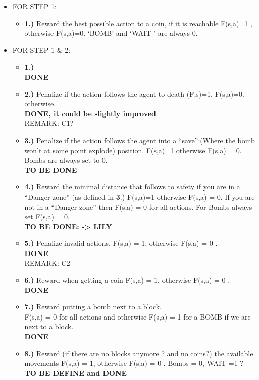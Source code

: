 \documentclass[a4paper]{article}
\begin{document}
\begin{itemize}

\item FOR STEP 1:
\begin{itemize} 
\item \textbf{1.)} Reward the best possible action to a coin, if it is reachable F(s,a)=1 ,  otherwise F(s,a)=0.    `BOMB' and `WAIT ' are always 0.
\end{itemize}

\item FOR STEP 1 \& 2:
\begin {itemize}
\item \textbf{1.)} \\  \textbf{DONE}  
\item  \textbf{2.)} Penalize if the action follows the agent to death (F,s)=1, F(s,a)=0. otherwise.  \\ \textbf{DONE, it could be slightly improved} \\
REMARK: C1?
\item \textbf{3.)} Penalize if the action follows the agent into a ``save'':(Where the bomb won't at some point explode) position.  F(s,a)=1 otherwise F(s,a) = 0.  Bombs are always set to 0.
 \\  \textbf{TO BE DONE}  
 \item \textbf{4.)}  Reward the minimal distance that follows to safety if you are in a ``Danger zone'' (as defined in \textbf{3}.)  F(s,a)=1 otherwise F(s,a) = 0.
 If you are not in a ``Danger zone'' then F(s,a) =  0 for all actions.  For Bombs always set F(s,a) = 0.
  \\  \textbf{TO BE DONE: -> LILY}  
  \item \textbf{5.)} Penalize invalid actions.  F(s,a) = 1, otherwise F(s,a) = 0 .  
 \\  \textbf{DONE}  \\REMARK: C2
   \item \textbf{6.)} Reward when getting a coin F(s,a) = 1, otherwise F(s,a) = 0 .  
 \\  \textbf{DONE}  
 
    \item \textbf{7.)} Reward putting a bomb next to a block. \\ 
	 F(s,a) = 0 for all actions and otherwise F(s,a) = 1 for a BOMB if we are next to a block.  \\
	\textbf{DONE}  
 
     \item \textbf{8.)} Reward (if there are no blocks anymore ? and no coins?)  the available movements F(s,a) = 1, otherwise F(s,a) = 0 .   Bombs = 0, WAIT =1 ? 
 \\  \textbf{TO BE DEFINE and DONE}   
 

\end{itemize}
\end{itemize}
\end{document}
